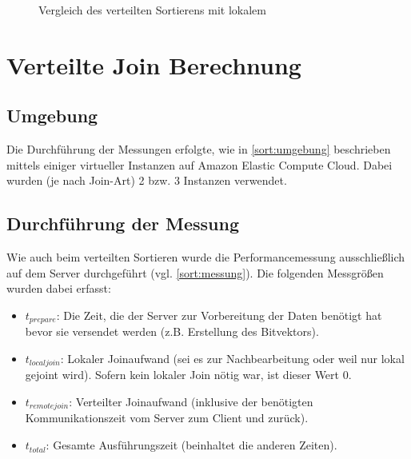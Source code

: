\documentclass[fontsize=12pt,a4paper,headinclude=no,headings=small]{scrartcl}
\begin{document}
\begin{figure}[H]
	\centering
	\caption{Vergleich des verteilten Sortierens mit lokalem}
	\label{fig.local.compare}
\end{figure}

\section{Verteilte Join Berechnung}
\subsection{Umgebung}
Die Durchführung der Messungen erfolgte, wie in \ref{sort:umgebung} beschrieben mittels einiger virtueller Instanzen auf Amazon Elastic Compute Cloud. Dabei wurden (je nach Join-Art) 2 bzw. 3 Instanzen verwendet.

\subsection{Durchführung der Messung}
Wie auch beim verteilten Sortieren wurde die Performancemessung ausschließlich auf dem Server durchgeführt (vgl. \ref{sort:messung}). Die folgenden Messgrößen wurden dabei erfasst:
\begin{itemize}
  \item $t_{prepare}$: Die Zeit, die der Server zur Vorbereitung der Daten benötigt hat bevor sie versendet werden (z.B. Erstellung des Bitvektors).
  \item $t_{localjoin}$: Lokaler Joinaufwand (sei es zur Nachbearbeitung oder weil nur lokal gejoint wird). Sofern kein lokaler Join nötig war, ist dieser Wert 0.
  \item $t_{remotejoin}$: Verteilter Joinaufwand (inklusive der benötigten Kommunikationszeit vom Server zum Client und zurück).
  \item $t_{total}$: Gesamte Ausführungszeit (beinhaltet die anderen Zeiten).
\end{itemize}
\end{document}
